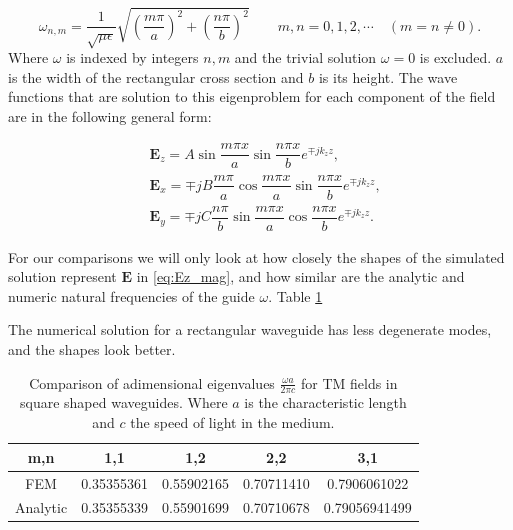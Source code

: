 \begin{equation}
\omega_{n,m} = \frac{1}{\sqrt{\mu\epsilon}}\sqrt{\left(\frac{m\pi}{a}\right)^2+\left(\frac{n\pi}{b}\right)^2}
\qquad m,n = 0,1,2,\cdots \quad (m=n\neq0).
\label{eq:eig_vals_sqare_waveguide}
\end{equation}
Where $\omega$ is indexed by integers $n,m$ and the trivial solution $\omega = 0$ is excluded. $a$ is the width of the rectangular cross section and $b$ is its height.
The wave functions that are solution to this eigenproblem for each component of the field are in the following general form:

\begin{align}
&\mathbf{E}_z = A\sin{\dfrac{m\pi x}{a}}\sin{\dfrac{n\pi x}{b}}e^{\mp jk_zz}, \label{eq:Ez_mag}\\
&\mathbf{E}_x =\mp jB\dfrac{m\pi}{a}\cos{\dfrac{m\pi x}{a}}\sin{\dfrac{n\pi x}{b}}e^{\mp jk_zz},\\
&\mathbf{E}_y =\mp jC\dfrac{n\pi}{b}\sin{\dfrac{m\pi x}{a}}\cos{\dfrac{n\pi x}{b}}e^{\mp jk_zz}.
\end{align}

For our comparisons we will only look at how closely the shapes of the simulated solution represent $\mathbf{E}$ in  \ref{eq:Ez_mag}, and how similar are the analytic and numeric  natural frequencies of the guide $\omega$.  Table \ref{tab:sq_wav_comparison} 

The numerical solution for a rectangular waveguide has less degenerate modes, and the shapes look better.
\begin{table}
\begin{center}
\begin{tabular}{|c|c|c|c|c|}
\hline 
m,n & 1,1 & 1,2 & 2,2 & 3,1 \\ 
\hline 
FEM  & 0.35355361 &  0.55902165 &  0.70711410 & 0.7906061022 \\ 
\hline 
Analytic  & 0.35355339 &  0.55901699 &  0.70710678 &  0.79056941499 \\
\hline 
\end{tabular} 
\caption{Comparison of adimensional eigenvalues $\frac{\omega a}{2\pi c}$ for TM fields in square shaped waveguides. Where $a$ is the characteristic length and $c$ the speed of light in the medium.}
\end{center}
\label{tab:sq_wav_comparison}
\end{table}


